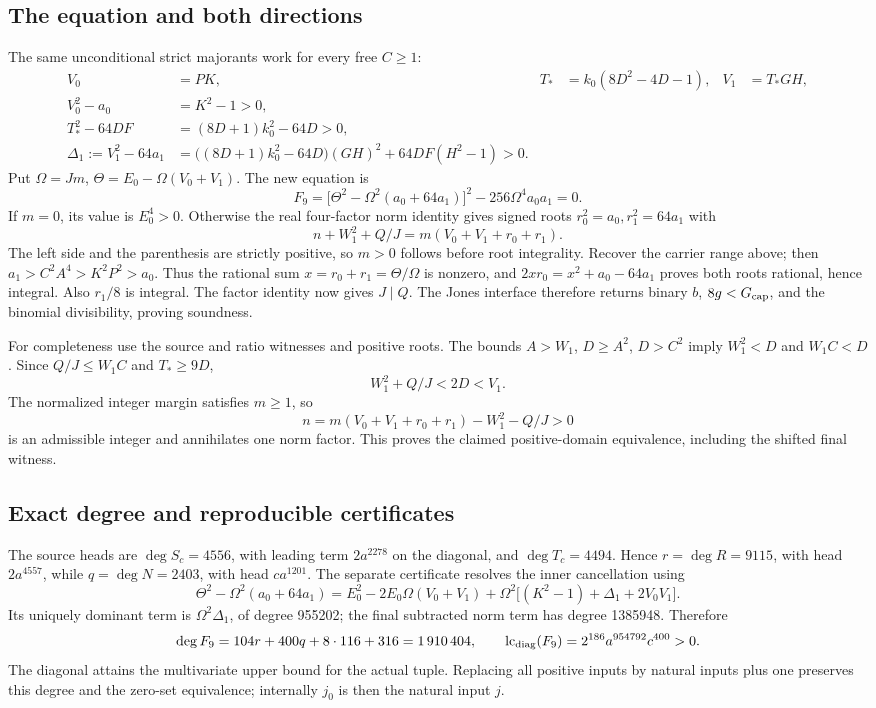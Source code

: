 \subsection{The equation and both directions}
The same unconditional strict majorants work for every free \(C\ge1\):
{\small
\begin{align*}
 V_0&=PK,&T_*&=k_0(8D^2-4D-1),&V_1&=T_*GH,\\
 V_0^2-a_0&=K^2-1>0,\\
 T_*^2-64DF&=(8D+1)k_0^2-64D>0,\\
 \Delta_1:=V_1^2-64a_1
 &=\bigl((8D+1)k_0^2-64D\bigr)(GH)^2+64DF(H^2-1)>0.
\end{align*}
}
Put \(\Omega=Jm\), \(\Theta=E_0-\Omega(V_0+V_1)\). The new equation is
\[
 \boxed{\ F_9=\bigl[\Theta^2-\Omega^2(a_0+64a_1)\bigr]^2
                 -256\Omega^4a_0a_1=0.\ }
\]
If \(m=0\), its value is \(E_0^4>0\). Otherwise the real four-factor
norm identity gives signed roots \(r_0^2=a_0,r_1^2=64a_1\) with
\[
 n+W_1^2+Q/J=m(V_0+V_1+r_0+r_1).
\]
The left side and the parenthesis are strictly positive, so \(m>0\)
follows before root integrality. Recover the carrier range above; then
\(a_1>C^2A^4>K^2P^2>a_0\). Thus the rational sum
\(x=r_0+r_1=\Theta/\Omega\) is nonzero, and
\(2xr_0=x^2+a_0-64a_1\) proves both roots rational, hence integral.
Also \(r_1/8\) is integral. The factor identity now gives \(J\mid Q\).
The Jones interface therefore returns binary \(b\), \(8g<G_{\rm cap}\),
and the binomial divisibility, proving soundness.

For completeness use the source and ratio witnesses and positive roots.
The bounds \(A>W_1\), \(D\ge A^2\), \(D>C^2\) imply
\(W_1^2<D\) and \(W_1C<D\). Since \(Q/J\le W_1C\) and
\(T_*\ge9D\),
\[
 W_1^2+Q/J<2D<V_1.
\]
The normalized integer margin satisfies \(m\ge1\), so
\[
 n=m(V_0+V_1+r_0+r_1)-W_1^2-Q/J>0
\]
is an admissible integer and annihilates one norm factor. This proves the
claimed positive-domain equivalence, including the shifted final witness.

\subsection{Exact degree and reproducible certificates}
The source heads are \(\deg S_c=4556\), with leading term \(2a^{2278}\)
on the diagonal, and \(\deg T_c=4494\). Hence
\(r=\deg R=9115\), with head \(2a^{4557}\), while
\(q=\deg N=2403\), with head \(ca^{1201}\). The separate certificate
resolves the inner cancellation using
\[
 \Theta^2-\Omega^2(a_0+64a_1)
 =E_0^2-2E_0\Omega(V_0+V_1)
  +\Omega^2\bigl[(K^2-1)+\Delta_1+2V_0V_1\bigr].
\]
Its uniquely dominant term is \(\Omega^2\Delta_1\), of degree 955202;
the final subtracted norm term has degree 1385948. Therefore
\[
 \deg F_9=104r+400q+8\cdot116+316=1\,910\,404,
 \qquad \operatorname{lc}_{\rm diag}(F_9)=2^{186}a^{954792}c^{400}>0.
\]
The diagonal attains the multivariate upper bound for the actual tuple.
Replacing all positive inputs by natural inputs plus one preserves this
degree and the zero-set equivalence; internally \(j_0\) is then the natural
input \(j\).

